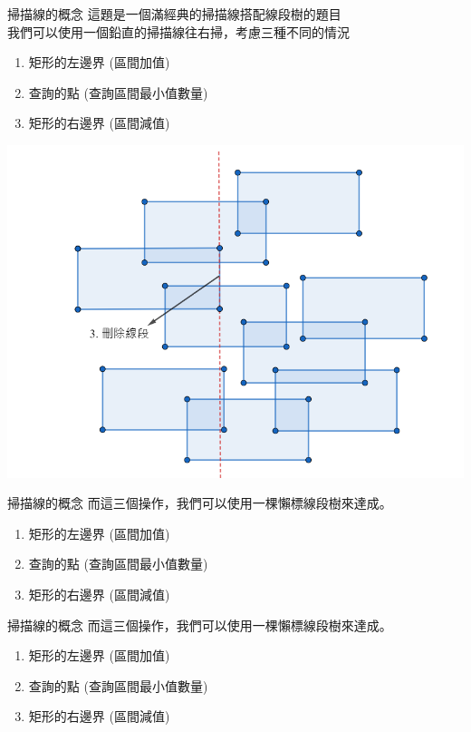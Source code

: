 \documentclass[aspectratio=169]{beamer}
\begin{document}
\begin{frame}{掃描線的概念}
    這題是一個滿經典的掃描線搭配線段樹的題目 \\
    \vspace{2.5mm}
    我們可以使用一個鉛直的掃描線往右掃，考慮三種不同的情況 \\
    \begin{enumerate}
        \item 矩形的左邊界 (區間加值)
        \item 查詢的點 (查詢區間最小值數量)
        \item 矩形的右邊界 (區間減值)
    \end{enumerate}
    \begin{center}
        \includegraphics[scale=0.25]{images/rectangle_area_4.png}
    \end{center}
\end{frame}

\begin{frame}{掃描線的概念}
    而這三個操作，我們可以使用一棵懶標線段樹來達成。
    \begin{enumerate}
        \item 矩形的左邊界 (區間加值)
        \item 查詢的點 (查詢區間最小值數量)
        \item 矩形的右邊界 (區間減值)
    \end{enumerate}
\end{frame}

\begin{frame}{掃描線的概念}
    而這三個操作，我們可以使用一棵懶標線段樹來達成。
    \begin{enumerate}
        \item 矩形的左邊界 (區間加值)
        \item 查詢的點 (查詢區間最小值數量)
        \item 矩形的右邊界 (區間減值)
    \end{enumerate}
\end{frame}
\end{document}
